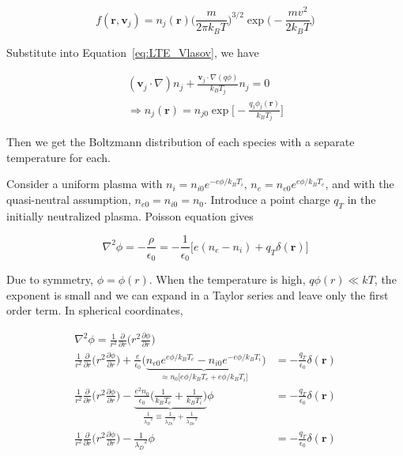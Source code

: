 \documentclass[
  notoc %
]{tufte-book}
\begin{document}
\[
f(\mathbf{r},\mathbf{v}_j)=n_j(\mathbf{r})\Big( \frac{m}{2\pi k_BT}\Big)^{3/2}\exp\Big( -\frac{mv^2}{2k_BT}\Big)
\]

Substitute into Equation~\ref{eq:LTE_Vlasov}, we have

\[
\begin{aligned}
(\mathbf{v}_j\cdot\nabla)n_j +\frac{\mathbf{v}_j\cdot\nabla(q\phi)}{k_BT_j}n_j=0 \\
\Rightarrow n_j(\mathbf{r}) = n_{j0} \exp\Big[ -\frac{q_j\phi_j(\mathbf{r})}{k_BT_j} \Big]
\end{aligned}
\]

Then we get the Boltzmann distribution of each species with a separate
temperature for each.

Consider a uniform plasma with \(n_i=n_{i0}e^{-e\phi/k_B T_i}\),
\(n_e=n_{e0}e^{e\phi/k_BT_e}\), and with the quasi-neutral assumption,
\(n_{e0}=n_{i0}=n_0\). Introduce a point charge \(q_T\) in the initially
neutralized plasma. Poisson equation gives

\[
\nabla^2 \phi=-\frac{\rho}{\epsilon_0}=-\frac{1}{\epsilon_0}\Big[ e(n_e-n_i) +q_T \delta(\mathbf{r})\Big]
\]

Due to symmetry, \(\phi=\phi(r)\). When the temperature is high,
\(q\phi(r)\ll kT\), the exponent is small and we can expand in a Taylor
series and leave only the first order term. In spherical coordinates,

\[
\begin{aligned}
\nabla^2\phi=\frac{1}{r^2}\frac{\partial}{\partial r}\Big( r^2\frac{\partial \phi}{\partial r} \Big)& \nonumber \\
\frac{1}{r^2}\frac{\partial}{\partial r}\Big( r^2\frac{\partial \phi}{\partial r} \Big)+\frac{e}{\epsilon_0}\Big( \underbrace{ n_{e0}e^{e\phi/k_BT_e} - n_{i0}e^{-e\phi/k_B T_i} }_{\approx n_0\big[ e\phi/k_BT_e +e\phi/k_BT_i  \big]}\Big)&= -\frac{q_T}{\epsilon_0}\delta(\mathbf{r}) \\
\frac{1}{r^2}\frac{\partial}{\partial r}\Big( r^2\frac{\partial \phi}{\partial r} \Big) -\underbrace{\frac{e^2n_0}{\epsilon_0}\Big( \frac{1}{k_B T_e}+\frac{1}{k_BT_i}\Big) }_{ \frac{1}{{\lambda_D}^2}\equiv \frac{1}{{\lambda_{Di}}^2}+\frac{1}{{\lambda_{De}}^2}}\phi&=-\frac{q_T}{\epsilon_0}\delta(\mathbf{r}) \\
\frac{1}{r^2}\frac{\partial}{\partial r}\Big( r^2\frac{\partial \phi}{\partial r} \Big) -\frac{1}{{\lambda_D}^2}\phi&=-\frac{q_T}{\epsilon_0}\delta(\mathbf{r})
\end{aligned}
\]
\end{document}
